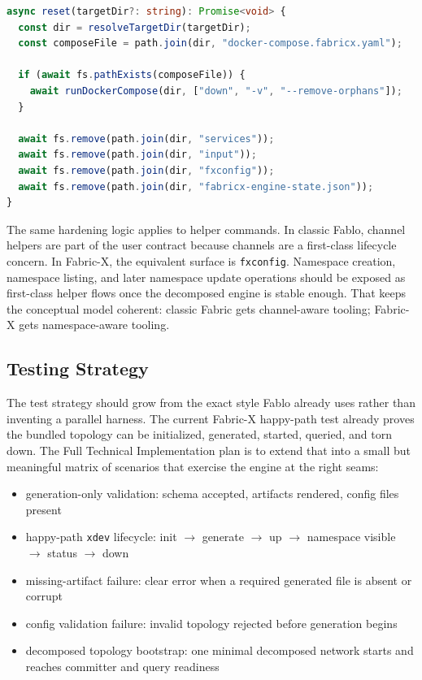 \begin{tcolorbox}[colback=gray!5!white, colframe=gray!50!black,
  title=Planned Fabric-X reset flow,
  fonttitle=\bfseries, arc=4pt]
\begin{lstlisting}[language=typescript, basicstyle=\ttfamily\small]
async reset(targetDir?: string): Promise<void> {
  const dir = resolveTargetDir(targetDir);
  const composeFile = path.join(dir, "docker-compose.fabricx.yaml");

  if (await fs.pathExists(composeFile)) {
    await runDockerCompose(dir, ["down", "-v", "--remove-orphans"]);
  }

  await fs.remove(path.join(dir, "services"));
  await fs.remove(path.join(dir, "input"));
  await fs.remove(path.join(dir, "fxconfig"));
  await fs.remove(path.join(dir, "fabricx-engine-state.json"));
}
\end{lstlisting}
\end{tcolorbox}

The same hardening logic applies to helper commands. In classic Fablo, channel helpers are part of the user contract because channels are a first-class lifecycle concern. In Fabric-X, the equivalent surface is \texttt{fxconfig}. Namespace creation, namespace listing, and later namespace update operations should be exposed as first-class helper flows once the decomposed engine is stable enough. That keeps the conceptual model coherent: classic Fabric gets channel-aware tooling; Fabric-X gets namespace-aware tooling.

\subsection{Testing Strategy}

The test strategy should grow from the exact style Fablo already uses rather than inventing a parallel harness. The current Fabric-X happy-path test already proves the bundled topology can be initialized, generated, started, queried, and torn down. The Full Technical Implementation plan is to extend that into a small but meaningful matrix of scenarios that exercise the engine at the right seams:
\begin{itemize}[leftmargin=*]
  \item generation-only validation: schema accepted, artifacts rendered, config files present
  \item happy-path \texttt{xdev} lifecycle: init $\rightarrow$ generate $\rightarrow$ up $\rightarrow$ namespace visible $\rightarrow$ status $\rightarrow$ down
  \item missing-artifact failure: clear error when a required generated file is absent or corrupt
  \item config validation failure: invalid topology rejected before generation begins
  \item decomposed topology bootstrap: one minimal decomposed network starts and reaches committer and query readiness
\end{itemize}

